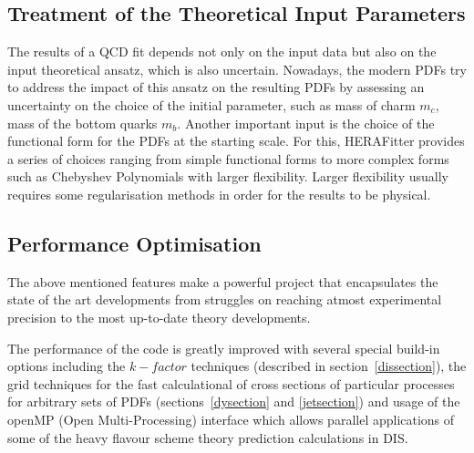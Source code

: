 \subsection{Treatment of the Theoretical Input Parameters}

The results of a QCD fit depends not only on the input data but also on the 
input theoretical ansatz, which is also uncertain. Nowadays, the modern PDFs 
try to address the impact of this ansatz on the resulting PDFs by assessing an 
uncertainty on the choice of the initial parameter, such as mass of charm $m_c$, mass of the bottom quarks $m_b$. Another important input is the choice of the functional form for the PDFs at the starting scale. 
For this, HERAFitter provides a series of choices ranging from simple functional forms to more complex forms such as Chebyshev Polynomials with larger flexibility. Larger flexibility usually requires some regularisation methods in order for the results to be physical.




\subsection{Performance Optimisation}

The above mentioned features make \fitter a powerful project that encapsulates the state of the art developments from struggles on reaching atmost 
experimental precision to the most up-to-date theory developments. 

The performance of the \fitter  code is greatly improved with several special build-in options
including the $k-factor$ techniques (described in section~\ref{dissection}), the grid techniques for the fast calculational of cross 
sections of particular processes for arbitrary sets of PDFs (sections~\ref{dysection} and \ref{jetsection}) 
and usage of the openMP (Open Multi-Processing) interface which allows
parallel applications of some of the heavy flavour scheme theory prediction calculations in DIS. 



